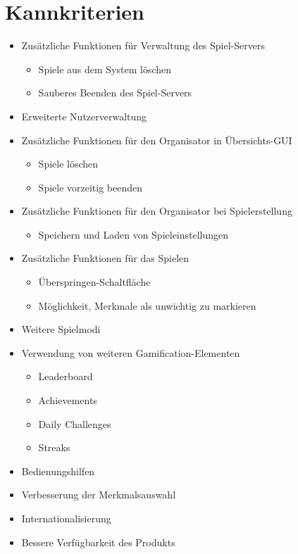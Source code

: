 \documentclass[a4paper]{scrreprt}
\begin{document}
    \section{Kannkriterien}
    \begin{itemize} %
    	\item Zusätzliche Funktionen für Verwaltung des Spiel-Servers
   	\begin{itemize}
            \item Spiele aus dem System löschen
            \item Sauberes Beenden des Spiel-Servers 
        \end{itemize}
	\item Erweiterte Nutzerverwaltung 
	\item Zusätzliche Funktionen für den \Gls{Organisator} in Übersichts-GUI
        \begin{itemize}
            \item Spiele löschen 
            \item Spiele vorzeitig beenden 
        \end{itemize}
	\item Zusätzliche Funktionen für den \Gls{Organisator} bei Spielerstellung
        \begin{itemize}
            \item Speichern und Laden von \Gls{Spieleinstellungen}
        \end{itemize}
        \item Zusätzliche Funktionen für das Spielen 
        \begin{itemize}
            \item Überspringen-Schaltfläche 
            \item Möglichkeit, Merkmale als unwichtig zu markieren 
        \end{itemize}
	\item Weitere Spielmodi 
	\item Verwendung von weiteren Gamification-Elementen 
        \begin{itemize}
            \item Leaderboard %
            \item Achievements %
            \item Daily Challenges %
            \item Streaks %
        \end{itemize}
        \item Bedienungshilfen 
        \item Verbesserung der Merkmalsauswahl %
        \item Internationalisierung 
        \item Bessere Verfügbarkeit des Produkts 
    \end{itemize}
\end{document}
